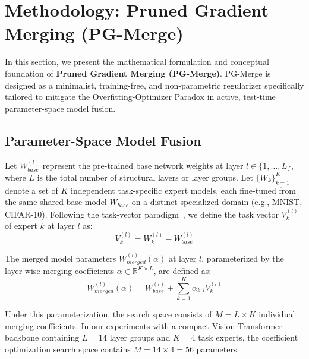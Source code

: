 \section{Methodology: Pruned Gradient Merging (PG-Merge)}
\label{sec:method}

In this section, we present the mathematical formulation and conceptual foundation of \textbf{Pruned Gradient Merging (PG-Merge)}. PG-Merge is designed as a minimalist, training-free, and non-parametric regularizer specifically tailored to mitigate the Overfitting-Optimizer Paradox in active, test-time parameter-space model fusion.

\subsection{Parameter-Space Model Fusion}
Let $W_{base}^{(l)}$ represent the pre-trained base network weights at layer $l \in \{1, \dots, L\}$, where $L$ is the total number of structural layers or layer groups. Let $\{W_k\}_{k=1}^K$ denote a set of $K$ independent task-specific expert models, each fine-tuned from the same shared base model $W_{base}$ on a distinct specialized domain (e.g., MNIST, CIFAR-10). Following the task-vector paradigm~\cite{ilharco2022editing}, we define the task vector $V_k^{(l)}$ of expert $k$ at layer $l$ as:
\begin{equation}
    V_k^{(l)} = W_k^{(l)} - W_{base}^{(l)}
\end{equation}

The merged model parameters $W_{merged}^{(l)}(\alpha)$ at layer $l$, parameterized by the layer-wise merging coefficients $\alpha \in \mathbb{R}^{K \times L}$, are defined as:
\begin{equation}
    W_{merged}^{(l)}(\alpha) = W_{base}^{(l)} + \sum_{k=1}^K \alpha_{k, l} V_k^{(l)}
    \label{eq:merging_defn}
\end{equation}

Under this parameterization, the search space consists of $M = L \times K$ individual merging coefficients. In our experiments with a compact Vision Transformer backbone containing $L=14$ layer groups and $K=4$ task experts, the coefficient optimization search space contains $M = 14 \times 4 = 56$ parameters.

